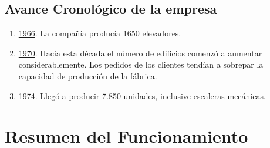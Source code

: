 \documentclass[12pt,a4paper,spanish]{article}
\begin{document}
\subsection{Avance Cronol\'{o}gico de la empresa}
\begin{enumerate}
	\item \underline{1966}. La compa\~{n}\'{i}a produc\'{i}a 1650 elevadores. 
	\item \underline{1970}. Hacia esta d\'{e}cada el n\'{u}mero de edificios comenz\'{o} a aumentar considerablemente. Los pedidos de los clientes tend\'{i}an a sobrepar la capacidad de producci\'{o}n de la f\'{a}brica.
	\item \underline{1974}. Lleg\'{o} a producir 7.850 unidades, inclusive escaleras mec\'{a}nicas.
\end{enumerate}

\section{Resumen del Funcionamiento}
\end{document}

